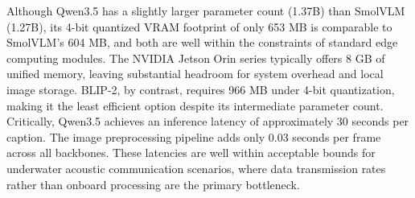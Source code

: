 Although Qwen3.5 has a slightly larger parameter count (1.37B) than SmolVLM
(1.27B), its 4-bit quantized VRAM footprint of only 653 MB is comparable to
SmolVLM's 604 MB, and both are well within the constraints of standard edge
computing modules. The NVIDIA Jetson Orin series typically offers 8 GB of
unified memory, leaving substantial headroom for system overhead and local image
storage. BLIP-2, by contrast, requires 966 MB under 4-bit quantization, making
it the least efficient option despite its intermediate parameter count.
Critically, Qwen3.5 achieves an inference latency of approximately 30 seconds per
caption. The image preprocessing pipeline adds only 0.03 seconds per frame across all backbones.
These latencies are well within acceptable bounds for underwater acoustic
communication scenarios, where data transmission rates rather than onboard
processing are the primary bottleneck.
